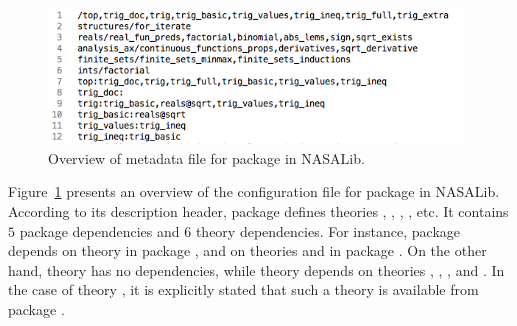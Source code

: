 \begin{figure}
  \centering
  \includegraphics[width=11cm]{images/top.png}
  \caption{Overview of metadata file for package  in NASALib.}
  \label{fig.top}
\end{figure}

Figure~\ref{fig.top} presents an overview of the configuration file
for package  in NASALib. According to its description
header, package  defines theories ,
, , , etc. It contains $5$
package dependencies and $6$ theory dependencies. For instance,
package  depends on theory  in package
, and on theories  and
 in package . On the
other hand, theory  has no dependencies, while theory
 depends on theories , ,
, and . In the case of theory
, it is explicitly stated that such a theory is available
from package .

